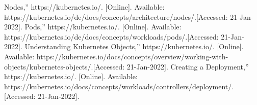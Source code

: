 \documentclass[12pt,oneside]{report}
\begin{document}
\begin{thebibliography}{10}
     Nodes,” https://kubernetes.io/. [Online]. 
    Available: https://kubernetes.io/de/docs/concepts/architecture/nodes/.[Accessed: 21-Jan-2022].
     Pods,” https://kubernetes.io/. [Online]. 
    Available: https://kubernetes.io/de/docs/concepts/workloads/pods/.[Accessed: 21-Jan-2022].
     Understanding Kubernetes Objects,” https://kubernetes.io/. [Online]. 
    Available: https://kubernetes.io/docs/concepts/overview/working-with-objects/kubernetes-objects/.[Accessed: 21-Jan-2022].  
     Creating a Deployment,” https://kubernetes.io/. [Online]. 
    Available: https://kubernetes.io/docs/concepts/workloads/controllers/deployment/.[Accessed: 21-Jan-2022].


  \end{thebibliography}
  \newpage
  
  \listoffigures
  \newpage

  \listoftables
  \newpage

  
\end{document}
